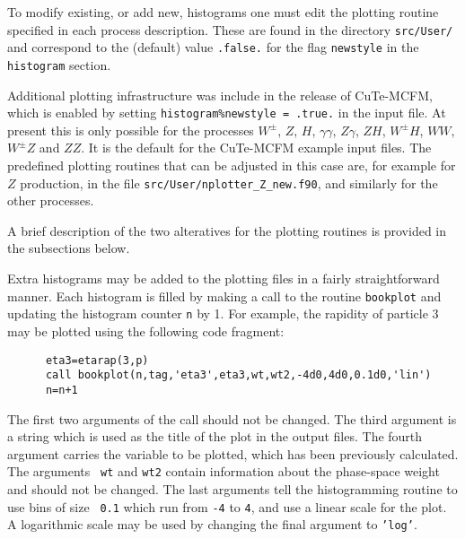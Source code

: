 To modify existing, or add new, histograms one must edit the plotting
routine specified in each process description.  These are found in
the directory {\tt src/User/} and correspond to the (default) value
{\tt .false.} for the flag {\tt newstyle} in the {\tt histogram} section.

Additional plotting infrastructure was include in the release
of CuTe-MCFM, which is enabled by setting {\tt histogram\%newstyle = .true.}
in the input file.
At present this is only possible for the processes
$W^\pm$, $Z$, $H$, $\gamma\gamma$, $Z\gamma$, $ZH$,
$W^\pm H$, $WW$, $W^\pm Z$ and $ZZ$.
It is the default for the CuTe-MCFM example input files.
The predefined plotting routines that can be adjusted in this case are,
for example for $Z$ production, in the file
{\tt src/User/nplotter\_Z\_new.f90}, and similarly for the other processes.

A brief description of the two alteratives for the plotting routines is
provided in the  subsections below.

\label{sec:oldhistos}

Extra histograms may be added to the plotting files in
a fairly straightforward manner. Each histogram is filled by making
a call to the routine {\tt bookplot} and updating the histogram
counter {\tt n} by 1. For example, the rapidity of particle $3$
may be plotted using the following code fragment:

\begin{verbatim}
      eta3=etarap(3,p)
      call bookplot(n,tag,'eta3',eta3,wt,wt2,-4d0,4d0,0.1d0,'lin')
      n=n+1
\end{verbatim}
The first two arguments of the call should not be changed. The third
argument is a string which is used as the title of the plot in the
output files. The fourth argument carries the variable to
be plotted, which has been previously calculated. The arguments {\tt
	wt} and {\tt wt2} contain information about the phase-space weight and
should not be changed. The
last arguments tell the histogramming routine to use bins of size {\tt
	0.1} which run from {\tt -4} to {\tt 4}, and use a linear scale for
the plot. A logarithmic scale may be used by changing the final
argument to {\tt 'log'}.

\label{sec:newhistos}

